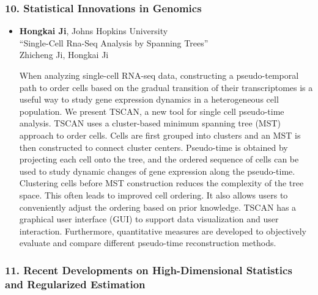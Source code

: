 \subsubsection*{10. Statistical Innovations in Genomics}

\begin{itemize}
\item \textbf{Hongkai Ji}, Johns Hopkins University \\
``Single-Cell Rna-Seq Analysis by Spanning Trees'' \\
Zhicheng Ji, Hongkai Ji


When analyzing single-cell RNA-seq data, constructing a pseudo-temporal path to order cells based on the gradual transition of their transcriptomes is a useful way to study gene expression dynamics in a heterogeneous cell population. We present TSCAN, a new tool for single cell pseudo-time analysis. TSCAN uses a cluster-based minimum spanning tree (MST) approach to order cells. Cells are first grouped into clusters and an MST is then constructed to connect cluster centers. Pseudo-time is obtained by projecting each cell onto the tree, and the ordered sequence of cells can be used to study dynamic changes of gene expression along the pseudo-time. Clustering cells before MST construction reduces the complexity of the tree space. This often leads to improved cell ordering. It also allows users to conveniently adjust the ordering based on prior knowledge. TSCAN has a graphical user interface (GUI) to support data visualization and user interaction. Furthermore, quantitative measures are developed to objectively evaluate and compare different pseudo-time reconstruction methods.

\end{itemize}

\subsubsection*{11. Recent Developments on High-Dimensional Statistics and Regularized Estimation}

